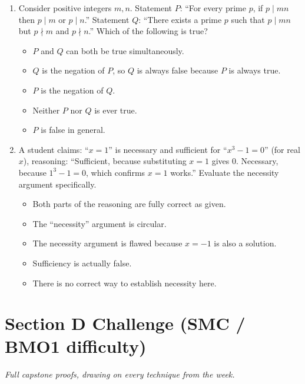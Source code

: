 \documentclass[11pt,a4paper]{article}
\begin{document}
\begin{enumerate}
\item Consider positive integers $m,n$. Statement $P$: ``For every prime $p$, if $p\mid mn$ then $p\mid m$ or $p\mid n$.'' Statement $Q$: ``There exists a prime $p$ such that $p\mid mn$ but $p\nmid m$ and $p\nmid n$.'' Which of the following is true?
\begin{itemize}
\item[A)] $P$ and $Q$ can both be true simultaneously.
\item[B)] $Q$ is the negation of $P$, so $Q$ is always false because $P$ is always true.
\item[C)] $P$ is the negation of $Q$.
\item[D)] Neither $P$ nor $Q$ is ever true.
\item[E)] $P$ is false in general.
\end{itemize}

\item A student claims: ``$x=1$'' is necessary and sufficient for ``$x^3-1=0$'' (for real $x$), reasoning: ``Sufficient, because substituting $x=1$ gives $0$. Necessary, because $1^3-1=0$, which confirms $x=1$ works.'' Evaluate the necessity argument specifically.
\begin{itemize}
\item[A)] Both parts of the reasoning are fully correct as given.
\item[B)] The ``necessity'' argument is circular.
\item[C)] The necessity argument is flawed because $x=-1$ is also a solution.
\item[D)] Sufficiency is actually false.
\item[E)] There is no correct way to establish necessity here.
\end{itemize}

\end{enumerate}

\section*{Section D \quad Challenge \hfill{\normalfont\small(SMC / BMO1 difficulty)}}

\noindent\textit{Full capstone proofs, drawing on every technique from the week.}
\end{document}
